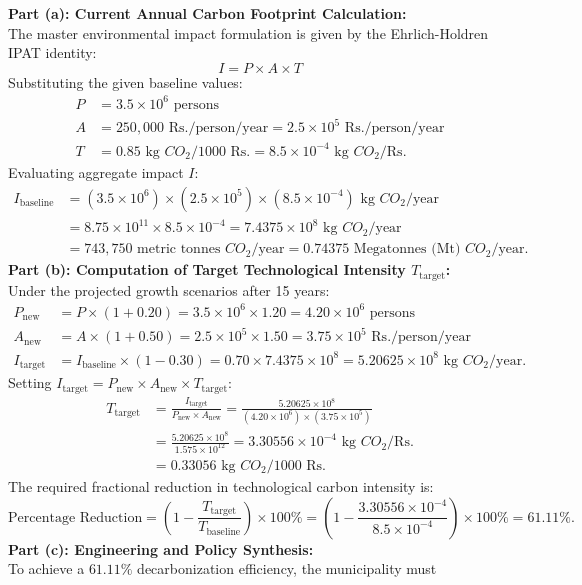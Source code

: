 \begin{solbox}
\textbf{Part (a): Current Annual Carbon Footprint Calculation:}\\The master environmental impact formulation is given by the Ehrlich-Holdren IPAT identity:\begin{equation}I = P \times A \times T\end{equation}Substituting the given baseline values:\begin{align*}P &= 3.5 \times 10^6\text{ persons} \\A &= 250{,}000\text{ Rs./person/year} = 2.5 \times 10^5\text{ Rs./person/year} \\T &= 0.85\text{ kg } CO_2 / 1000\text{ Rs.} = 8.5 \times 10^{-4}\text{ kg } CO_2/\text{Rs.}\end{align*}Evaluating aggregate impact $I$:\begin{align*}I_{\text{baseline}} &= (3.5 \times 10^6) \times (2.5 \times 10^5) \times (8.5 \times 10^{-4})\text{ kg } CO_2/\text{year} \\&= 8.75 \times 10^{11} \times 8.5 \times 10^{-4} = 7.4375 \times 10^8\text{ kg } CO_2/\text{year} \\&= 743{,}750\text{ metric tonnes } CO_2/\text{year} = 0.74375\text{ Megatonnes (Mt) } CO_2/\text{year}.\end{align*}\textbf{Part (b): Computation of Target Technological Intensity $T_{\text{target}}$:}\\Under the projected growth scenarios after 15 years:\begin{align*}P_{\text{new}} &= P \times (1 + 0.20) = 3.5 \times 10^6 \times 1.20 = 4.20 \times 10^6\text{ persons} \\A_{\text{new}} &= A \times (1 + 0.50) = 2.5 \times 10^5 \times 1.50 = 3.75 \times 10^5\text{ Rs./person/year} \\I_{\text{target}} &= I_{\text{baseline}} \times (1 - 0.30) = 0.70 \times 7.4375 \times 10^8 = 5.20625 \times 10^8\text{ kg } CO_2/\text{year}.\end{align*}Setting $I_{\text{target}} = P_{\text{new}} \times A_{\text{new}} \times T_{\text{target}}$:\begin{align*}T_{\text{target}} &= \frac{I_{\text{target}}}{P_{\text{new}} \times A_{\text{new}}} = \frac{5.20625 \times 10^8}{(4.20 \times 10^6) \times (3.75 \times 10^5)} \\&= \frac{5.20625 \times 10^8}{1.575 \times 10^{12}} = 3.30556 \times 10^{-4}\text{ kg } CO_2/\text{Rs.} \\&= 0.33056\text{ kg } CO_2 / 1000\text{ Rs.}\end{align*}The required fractional reduction in technological carbon intensity is:\begin{equation*}\text{Percentage Reduction} = \left(1 - \frac{T_{\text{target}}}{T_{\text{baseline}}}\right) \times 100\% = \left(1 - \frac{3.30556 \times 10^{-4}}{8.5 \times 10^{-4}}\right) \times 100\% = 61.11\%.\end{equation*}\textbf{Part (c): Engineering and Policy Synthesis:}\\To achieve a $61.11\%$ decarbonization efficiency, the municipality must 
\end{solbox}
